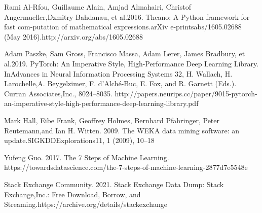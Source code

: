 \documentclass[conference]{IEEEtran}
\begin{document}
\begin{thebibliography}{00}
 Rami  Al-Rfou,  Guillaume  Alain,  Amjad  Almahairi,  Christof  Angermueller,Dzmitry Bahdanau, et al.2016. Theano: A Python framework for fast com-putation of mathematical expressions.arXiv e-printsabs/1605.02688 (May 2016).http://arxiv.org/abs/1605.02688

 Adam Paszke, Sam Gross, Francisco Massa, Adam Lerer, James Bradbury, et al.2019. PyTorch: An Imperative Style, High-Performance Deep Learning Library. InAdvances in Neural Information Processing Systems 32, H. Wallach, H. Larochelle,A. Beygelzimer, F. d'Alché-Buc, E. Fox, and R. Garnett (Eds.). Curran Associates,Inc., 8024–8035.   http://papers.neurips.cc/paper/9015-pytorch-an-imperative-style-high-performance-deep-learning-library.pdf

 Mark Hall, Eibe Frank, Geoffrey Holmes, Bernhard Pfahringer, Peter Reutemann,and Ian H. Witten. 2009. The WEKA data mining software: an update.SIGKDDExplorations11, 1 (2009), 10–18

 Yufeng Guo. 2017. The 7 Steps of Machine Learning.   https://towardsdatascience.com/the-7-steps-of-machine-learning-2877d7e5548e

 Stack Exchange Community. 2021. Stack Exchange Data Dump: Stack Exchange,Inc.: Free Download, Borrow, and Streaming.https://archive.org/details/stackexchange

\end{thebibliography}
\end{document}
